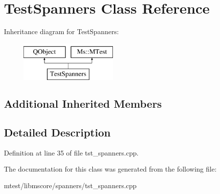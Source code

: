 \hypertarget{class_test_spanners}{}\section{Test\+Spanners Class Reference}
\label{class_test_spanners}
Inheritance diagram for Test\+Spanners\+:\begin{figure}[H]
\begin{center}
\leavevmode
\includegraphics[height=2.000000cm]{class_test_spanners}
\end{center}
\end{figure}
\subsection*{Additional Inherited Members}


\subsection{Detailed Description}


Definition at line 35 of file tst\+\_\+spanners.\+cpp.



The documentation for this class was generated from the following file\+:\begin{DoxyCompactItemize}
\item 
mtest/libmscore/spanners/tst\+\_\+spanners.\+cpp\end{DoxyCompactItemize}
